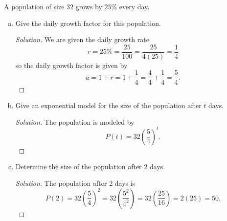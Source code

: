 \documentclass[12pt]{amsart}
\begin{document}
\begin{thm}[16 Points]
  A population of size $32$ grows by $25\%$ every day.
  \begin{enumerate}[(a)]
  \item
    Give the daily growth factor for this population.
    \begin{proof}[Solution]
      We are given the daily growth rate
      $$r = 25\% = \frac{25}{100} = \frac{25}{4(25)} = \frac{1}{4}$$
      so the daily growth factor is given by
      \[a = 1 + r = 1 + \frac{1}{4} = \frac{4}{4} + \frac{1}{4} = \frac{5}{4}.\]
    \end{proof}
  \item
    Give an exponential model for the size of the population after $t$ days.
    \begin{proof}[Solution]
      The population is modeled by
      \[P(t) = 32\left(\frac{5}{4}\right)^t.\]
    \end{proof}
  \item
    Determine the size of the population after 2 days.
    
    \begin{proof}[Solution]
      The population after 2 days is
      \[P(2) = 32\left(\frac{5}{4}\right)^2 = 32\left(\frac{5^2}{4^2}\right)= 32\left(\frac{25}{16}\right) = 2(25) = 50.\]
    \end{proof}
  \end{enumerate}
\end{thm}


\end{document}
